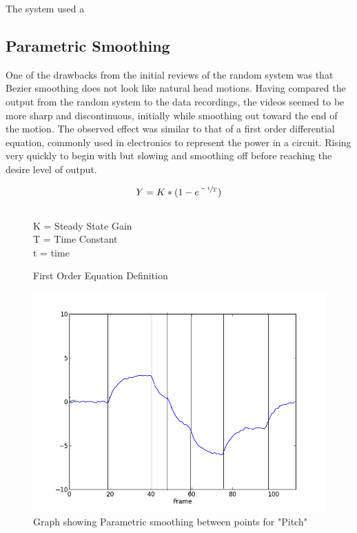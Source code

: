 \documentclass[bsc,frontabs,twoside,singlespacing,parskip]{infthesis}
\begin{document}
The system used a 

\subsection{Parametric Smoothing}

One of the drawbacks from the initial reviews of the random system was that Bezier smoothing does not look like natural head motions. Having compared the output from the random system to the data recordings, the videos seemed to be more sharp and discontinuous, initially while smoothing out toward the end of the motion. The observed effect was similar to that of a first order differential equation, commonly used in electronics to represent the power in a circuit. Rising very quickly to begin with but slowing and smoothing off before reaching the desire level of output. 

\begin{figure}
	\centering
	$$ Y =  K * (1 - e^{\sfrac{-t}{T}})$$
	\\
	K = Steady State Gain\\
	T = Time Constant\\
	t = time\\
	
	\caption{First Order Equation Definition} 
\end{figure}


\begin{figure}
	\includegraphics[width=1.0\textwidth]{parametric.png}
	\caption{Graph showing Parametric smoothing between points for "Pitch"}
\end{figure}
\end{document}
